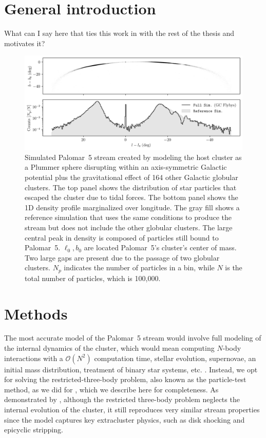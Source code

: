 \section{General introduction}

    What can I say here that ties this work in with the rest of the thesis and motivates it? 

    \begin{figure}
        \centering
        \includegraphics[width=\linewidth]{images/stream_on_sky_Pal5_monte-carlo-009_pouliasis2017pii-GCNBody_pouliasis2017pii.png}
        \caption{Simulated Palomar~5 stream created by modeling the host cluster as a Plummer sphere disrupting within an axis-symmetric Galactic potential plus the gravitational effect of 164 other Galactic globular clusters. The top panel shows the distribution of star particles that escaped the cluster due to tidal forces. The bottom panel shows the 1D density profile marginalized over longitude. The gray fill shows a reference simulation that uses the same conditions to produce the stream but does not include the other globular clusters. The large central peak in density is composed of particles still bound to Palomar~5. $\ell_0,b_0$ are located Palomar~5's cluster's center of mass. Two large gaps are present due to the passage of two globular clusters. $N_p$ indicates the number of particles in a bin, while $N$ is the total number of particles, which is 100,000.}
        \label{fig:stream_on_sky}
    \end{figure}

\section{Methods}
    The most accurate model of the Palomar~5 stream would involve full modeling of the internal dynamics of the cluster, which would mean computing $N$-body interactions with a $\mathcal{O}(N^2)$ computation time, stellar evolution, supernovae, an initial mass distribution, treatment of binary star systems, etc. \citep[for such an example, see][]{2021NatAs...5..957G, 2016MNRAS.458.1450W}. Instead, we opt for solving the restricted-three-body problem, also known as the particle-test method, as we did for \citet{2023A&A...673A..44F}, which we describe here for completeness. As demonstrated by \citet{2012A&A...546L...7M}, although the restricted three-body problem neglects the internal evolution of the cluster, it still reproduces very similar stream properties since the model captures key extracluster physics, such as disk shocking and epicyclic stripping.\\

